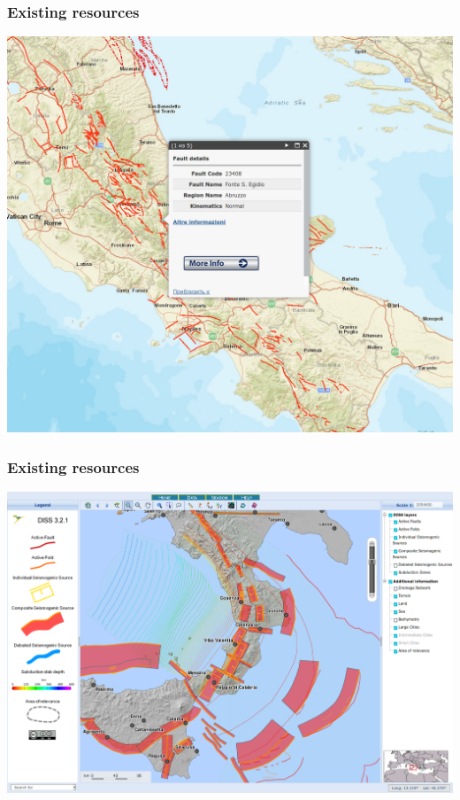 \documentclass[10pt]{beamer}
\begin{document}
\begin{frame}
  \frametitle{Existing resources}
  \centering
  \includegraphics[width=\linewidth]{italy-1.png}
\end{frame}

\begin{frame}
  \frametitle{Existing resources}
  \centering
  \includegraphics[width=\linewidth]{italy-2.png}
\end{frame}
\end{document}
